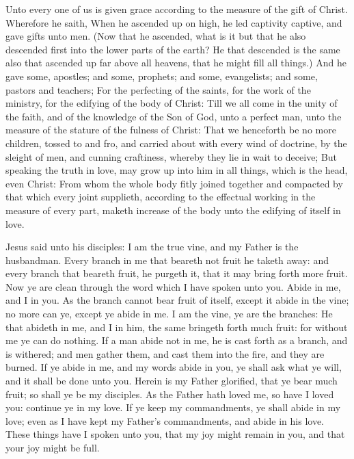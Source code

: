  Unto every one of us is given grace according to the measure of the gift of Christ. Wherefore he saith, When he ascended up on high, he led captivity captive, and gave gifts unto men. (Now that he ascended, what is it but that he also descended first into the lower parts of the earth? He that descended is the same also that ascended up far above all heavens, that he might fill all things.) And he gave some, apostles; and some, prophets; and some, evangelists; and some, pastors and teachers; For the perfecting of the saints, for the work of the ministry, for the edifying of the body of Christ: Till we all come in the unity of the faith, and of the knowledge of the Son of God, unto a perfect man, unto the measure of the stature of the fulness of Christ: That we henceforth be no more children, tossed to and fro, and carried about with every wind of doctrine, by the sleight of men, and cunning craftiness, whereby they lie in wait to deceive; But speaking the truth in love, may grow up into him in all things, which is the head, even Christ: From whom the whole body fitly joined together and compacted by that which every joint supplieth, according to the effectual working in the measure of every part, maketh increase of the body unto the edifying of itself in love.


\tractnotice
{}

 Jesus said unto his disciples: I am the true vine, and my Father is the husbandman. Every branch in me that beareth not fruit he taketh away: and every branch that beareth fruit, he purgeth it, that it may bring forth more fruit. Now ye are clean through the word which I have spoken unto you. Abide in me, and I in you. As the branch cannot bear fruit of itself, except it abide in the vine; no more can ye, except ye abide in me. I am the vine, ye are the branches: He that abideth in me, and I in him, the same bringeth forth much fruit: for without me ye can do nothing. If a man abide not in me, he is cast forth as a branch, and is withered; and men gather them, and cast them into the fire, and they are burned. If ye abide in me, and my words abide in you, ye shall ask what ye will, and it shall be done unto you. Herein is my Father glorified, that ye bear much fruit; so shall ye be my disciples. As the Father hath loved me, so have I loved you: continue ye in my love. If ye keep my commandments, ye shall abide in my love; even as I have kept my Father's commandments, and abide in his love. These things have I spoken unto you, that my joy might remain in you, and that your joy might be full.

